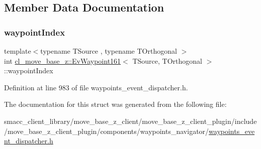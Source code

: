 \subsection{Member Data Documentation}
\mbox{\label{structcl__move__base__z_1_1EvWaypoint161_a4c76cde6c6660e744b5ca7e58da1b0cb}} 
\subsubsection{\texorpdfstring{waypoint\+Index}{waypointIndex}}
{\footnotesize\ttfamily template$<$typename T\+Source , typename T\+Orthogonal $>$ \\
int \hyperlink{structcl__move__base__z_1_1EvWaypoint161}{cl\+\_\+move\+\_\+base\+\_\+z\+::\+Ev\+Waypoint161}$<$ T\+Source, T\+Orthogonal $>$\+::waypoint\+Index}



Definition at line 983 of file waypoints\+\_\+event\+\_\+dispatcher.\+h.



The documentation for this struct was generated from the following file\+:\begin{DoxyCompactItemize}
\item 
smacc\+\_\+client\+\_\+library/move\+\_\+base\+\_\+z\+\_\+client/move\+\_\+base\+\_\+z\+\_\+client\+\_\+plugin/include/move\+\_\+base\+\_\+z\+\_\+client\+\_\+plugin/components/waypoints\+\_\+navigator/\hyperlink{waypoints__event__dispatcher_8h}{waypoints\+\_\+event\+\_\+dispatcher.\+h}\end{DoxyCompactItemize}
